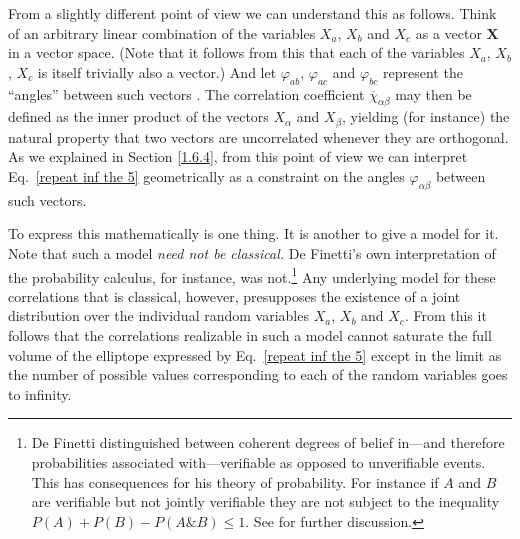 From a slightly different point of view we can understand this as follows. Think of an arbitrary linear combination of the variables $X_a$, $X_b$ and $X_c$ as a vector $\mathbf{X}$ in a vector space. (Note that it follows from this that each of the variables $X_a$, $X_b$, $X_c$ is itself trivially also a vector.) And let $\varphi_{ab}$, $\varphi_{ac}$ and $\varphi_{bc}$ represent the ``angles'' between such vectors \citep[cf.][Section 4]{De Finetti 1937}. The correlation coefficient $\overline{\chi}_{\alpha\beta}$ may then be defined as the inner product of the vectors $X_\alpha$ and $X_\beta$, yielding (for instance) the natural property that two vectors are uncorrelated whenever they are orthogonal. As we explained in Section \ref{1.6.4}, from this point of view we can interpret Eq.\ \eqref{repeat inf the 5} geometrically as a constraint on the angles $\varphi_{\alpha\beta}$ between such vectors.

To express this mathematically is one thing. It is another to give a model for it. Note that such a model \emph{need not be classical.} De Finetti's own interpretation of the probability calculus, for instance, was not.\footnote{De Finetti distinguished between coherent degrees of belief in---and therefore probabilities associated with---verifiable as opposed to unverifiable events. This has consequences for his theory of probability. For instance if $A$ and $B$ are verifiable but not jointly verifiable they are not subject to the inequality $P(A) + P(B) - P(A\& B) \leq 1$. See \citet{Berkovitz 2012, Berkovitz 2019} for further discussion.} Any underlying model for these correlations that is classical, however, presupposes the existence of a joint distribution over the individual random variables $X_a$, $X_b$ and $X_c$. From this it follows that the correlations realizable in such a model cannot saturate the full volume of the elliptope expressed by Eq.\ \eqref{repeat inf the 5} except in the limit as the number of possible values corresponding to each of the random variables goes to infinity.

